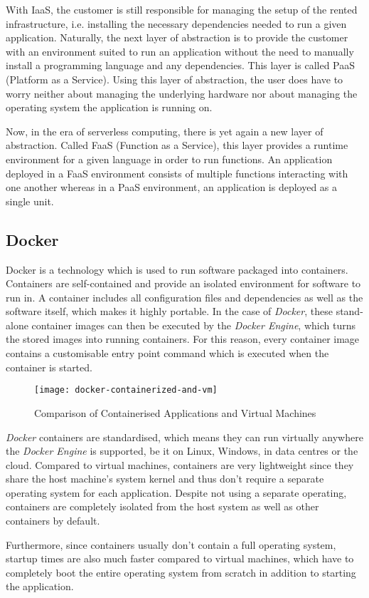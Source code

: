 With IaaS, the customer is still responsible for managing the setup of the rented infrastructure,
i.e. installing the necessary dependencies needed to run a given application. Naturally, the next
layer of abstraction is to provide the customer with an environment suited to run an application
without the need to manually install a programming language and any dependencies. This layer is
called PaaS (Platform as a Service). Using this layer of abstraction, the user does have to worry
neither about managing the underlying hardware nor about managing the operating system the
application is running on.

Now, in the era of serverless computing, there is yet again a new layer of abstraction. Called
FaaS (Function as a Service), this layer provides a runtime environment for a given language in
order to run functions. An application deployed in a FaaS environment consists of multiple
functions interacting with one another whereas in a PaaS environment, an application is deployed
as a single unit.

\subsection{Docker}

Docker is a technology which is used to run software packaged into containers. Containers are
self-contained and provide an isolated environment for software to run in. A container includes
all configuration files and dependencies as well as the software itself, which makes it highly
portable. In the case of \textit{Docker}, these stand-alone container images can then be executed
by the \textit{Docker Engine}, which turns the stored images into running containers. For this
reason, every container image contains a customisable entry point command which is executed when
the container is started.

\begin{figure}[H]
  \centering
  \texttt{[image: docker-containerized-and-vm]}
  \caption{Comparison of Containerised Applications and Virtual Machines \cite{docker-container}}
\end{figure}

\textit{Docker} containers are standardised, which means they can run virtually anywhere the
\textit{Docker Engine} is supported, be it on Linux, Windows, in data centres or the cloud.
Compared to virtual machines, containers are very lightweight since they share the host machine's
system kernel and thus don't require a separate operating system for each application. Despite
not using a separate operating, containers are completely isolated from the host system as well as
other containers by default.

Furthermore, since containers usually don't contain a full operating system, startup times are
also much faster compared to virtual machines, which have to completely boot the entire operating
system from scratch in addition to starting the application. \cite{docker-container}
